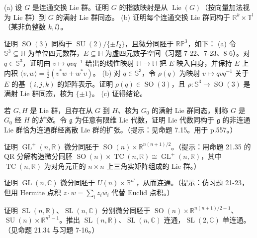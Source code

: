 \documentclass[../../main.tex]{subfiles}
\begin{document}
\begin{exercise}\label{exercise:ch21-20}
(a) 设 $G$ 是连通交换 Lie 群。证明 $G$ 的指数映射是从 $\operatorname{Lie}(G)$（按向量加法视为 Lie 群）到 $G$ 的满射 Lie 群同态。
(b) 证明每个连通交换 Lie 群同构于 $\mathbb{R}^k\times\mathbb{T}^l$（某非负整数 $k,l$）。
\end{exercise}

\begin{exercise}\label{exercise:ch21-21}
证明 $\operatorname{SO}(3)$ 同构于 $\operatorname{SU}(2)/\{\pm I_2\}$，且微分同胚于 $\mathbb{RP}^3$，如下：
(a) 令 $\mathbb{S}^3\subseteq\mathbb{H}$ 为单位四元数群，$E\subseteq\mathbb{H}$ 为虚四元数子空间（习题 7-22、7-23、8-6）。对 $q\in\mathbb{S}^3$，证明由 $v\mapsto qvq^{-1}$ 给出的线性映射 $\mathbb{H}\to\mathbb{H}$ 把 $E$ 映入自身，并保持 $E$ 上内积 $\langle v,w\rangle=\frac12(v^\ast w+w^\ast v)$。
(b) 对 $q\in\mathbb{S}^3$，令 $\rho(q)$ 为映射 $v\mapsto qvq^{-1}$ 关于 $E$ 的基 $(i,j,k)$ 的矩阵表示。证明 $\rho(q)\in\operatorname{SO}(3)$，且 $\rho\colon\mathbb{S}^3\to\operatorname{SO}(3)$ 是满射 Lie 群同态，核为 $\{\pm1\}$。
(c) 证得结论。
\end{exercise}

\begin{exercise}\label{exercise:ch21-22}
若 $G,H$ 是 Lie 群，且存在从 $G$ 到 $H$、核为 $G_0$ 的满射 Lie 群同态，则称 $G$ 是 $G_0$ 经 $H$ 的\emph{扩张}。令 $\mathfrak g$ 为任意有限维 Lie 代数，证明 Lie 代数同构于 $\mathfrak g$ 的非连通 Lie 群恰为连通群经离散 Lie 群的扩张。（提示：见命题 7.15。用于 p.557。）
\end{exercise}

\begin{exercise}\label{exercise:ch21-23}
证明 $\operatorname{GL}^+(n,\mathbb{R})$ 微分同胚于 $\operatorname{SO}(n)\times\mathbb{R}^{n(n+1)/2}$。（提示：用命题 21.35 的 QR 分解构造微分同胚 $\operatorname{SO}(n)\times\operatorname{TC}(n,\mathbb{R})\cong\operatorname{GL}^+(n,\mathbb{R})$，其中 $\operatorname{TC}(n,\mathbb{R})$ 为对角元正的 $n\times n$ 上三角实矩阵组成的 Lie 群。）
\end{exercise}

\begin{exercise}\label{exercise:ch21-24}
证明 $\operatorname{GL}(n,\mathbb{C})$ 微分同胚于 $U(n)\times\mathbb{R}^{n^2}$，从而连通。（提示：仿习题 21-23，但用 Hermite 点积 $z\cdot w=\sum_i z_i\overline{w_i}$ 代替 Euclid 点积。）
\end{exercise}

\begin{exercise}\label{exercise:ch21-25}
证明 $\operatorname{SL}(n,\mathbb{R})$、$\operatorname{SL}(n,\mathbb{C})$ 分别微分同胚于 $\operatorname{SO}(n)\times\mathbb{R}^{n(n+1)/2-1}$、$\operatorname{SU}(n)\times\mathbb{R}^{n^2-1}$。推出 $\operatorname{SL}(n,\mathbb{R})$、$\operatorname{SL}(n,\mathbb{C})$ 连通，$\operatorname{SL}(2,\mathbb{C})$ 单连通。（见命题 21.34 与习题 7-16。）
\end{exercise}
\end{document}
